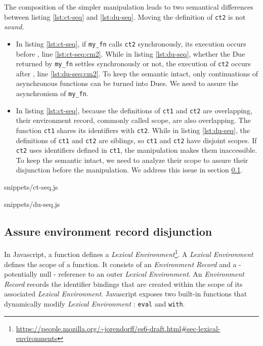 The composition of the simpler manipulation leads to two semantical differences between listing \ref{lst:ct-seq} and \ref{lst:du-seq}.
Moving the definition of \texttt{ct2} is not \textit{sound}.
\begin{itemize}
  \item In listing \ref{lst:ct-seq}, if \texttt{my\_fn} calls \texttt{ct2} synchronously, its execution occurs before , line \ref{lst:ct-seq:cm2}.
  While in listing \ref{lst:du-seq}, whether the Due returned by \texttt{my\_fn} settles synchronously or not, the execution of \texttt{ct2} occurs after , line \ref{lst:du-seq:cm2}.
  To keep the semantic intact, only continuations of asynchronous functions can be turned into Dues.
  We need to assure the asynchronism of \texttt{my\_fn}.
  \item In listing \ref{lst:ct-seq}, because the definitions of \texttt{ct1} and \texttt{ct2} are overlapping, their environment record, commonly called scope, are also overlapping.
  The function \texttt{ct1} shares its identifiers with \texttt{ct2}.
  While in listing \ref{lst:du-seq}, the definitions of \texttt{ct1} and \texttt{ct2} are siblings, so \texttt{ct1} and \texttt{ct2} have disjoint scopes.
  If \texttt{ct2} uses identifiers defined in \texttt{ct1}, the manipulation makes them inaccessible.
  To keep the semantic intact, we need to analyze their scope to assure their disjunction before the manipulation. 
  We address this issue in section \ref{section:disjunction}.
\end{itemize}

             {snippets/ct-seq.js}

             {snippets/du-seq.js}

\subsection{Assure environment record disjunction} \label{section:disjunction}

In Javascript, a function defines a \textit{Lexical Environment}\footnote{\url{https://people.mozilla.org/~jorendorff/es6-draft.html\#sec-lexical-environments}}.
A \textit{Lexical Environment} defines the scope of a function.
It consists of an \textit{Environment Record} and a - potentially null - reference to an outer \textit{Lexical Environment}.
An \textit{Environment Record} records the identifier bindings that are created within the scope of its associated \textit{Lexical Environment}.
Javascript exposes two built-in functions that dynamically modify \textit{Lexical Environment} : \texttt{eval} and \texttt{with}.


